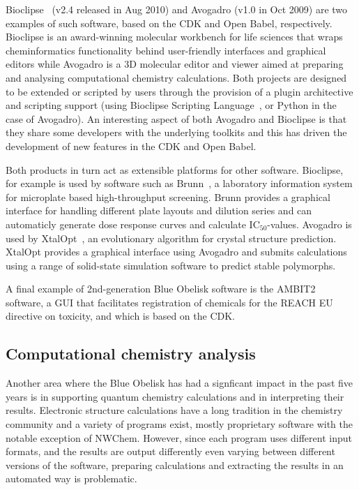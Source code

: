\documentclass[10pt]{bmc_article}
\newenvironment{bmcformat}{\fussy\setboolean{publ}{true}}{\fussy}
\begin{document}
\begin{bmcformat}
Bioclipse~\cite{Spjuth:2007fk} (v2.4 released in Aug 2010) and Avogadro
\cite{WebAvogadro} (v1.0 in Oct 2009) are two examples of such software, based
on the CDK and Open Babel, respectively. Bioclipse is an award-winning
molecular workbench for life sciences
that wraps cheminformatics functionality behind user-friendly interfaces and
graphical editors while Avogadro is a 3D molecular editor and viewer aimed at
preparing and analysing computational chemistry calculations. Both
projects are designed to be extended or scripted by users through
the provision of a plugin architective and scripting support (using
Bioclipse Scripting Language~\cite{Bioclipse2}, or Python in the case
of Avogadro). An interesting aspect of both Avogadro and Bioclipse is
that they share some developers with the underlying toolkits and this
has driven the development of new features in the CDK and Open Babel.

Both products in turn act as extensible platforms for other
software. Bioclipse, for example is used by software
such as Brunn~\cite{Alvarsson:2011fk}, a laboratory information system for
microplate based high-throughput screening. Brunn provides a graphical interface
for handling different plate layouts and dilution series and can automaticly
generate dose response curves and calculate IC$_{50}$-values. Avogadro
is used by XtalOpt~\cite{WebXtalOpt}\cite{Lonie2011}, an evolutionary
algorithm for crystal structure prediction. XtalOpt provides a
graphical interface using Avogadro and submits calculations using a
range of solid-state simulation software to predict stable polymorphs.

A final example of 2nd-generation Blue Obelisk software is the 
AMBIT2~\cite{WebAMBIT} software, a GUI that facilitates registration
of chemicals for the REACH EU directive on toxicity, and which is
based on the CDK.

\subsection*{Computational chemistry analysis}

Another area where the Blue Obelisk has had a signficant impact in the
past five years is in supporting
quantum chemistry calculations and in interpreting their results.
Electronic structure calculations have a long tradition in the
chemistry community and a variety of programs exist, mostly
proprietary software with the notable exception of NWChem.
However, since each program uses different input formats, and the
results are output differently even varying between different versions
of the software, preparing calculations and extracting the results in
an automated way is problematic. 


\end{bmcformat}
\end{document}
